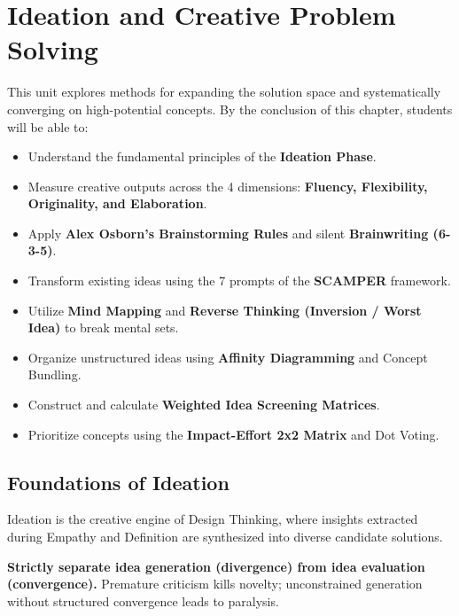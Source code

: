 \chapter{Ideation and Creative Problem Solving}
\label{chap:ideation_creative_solving}

\begin{tcolorbox}[enhanced, colback=boxnavybg, colframe=brandnavy, boxrule=1.2pt, arc=4pt, title={\Large\bfseries\sffamily Unit 3 Overview \& Learning Objectives}]
\sffamily\normalsize
This unit explores methods for expanding the solution space and systematically converging on high-potential concepts. By the conclusion of this chapter, students will be able to:
\begin{itemize}[leftmargin=1.2em, itemsep=2pt, topsep=3pt]
    \item Understand the fundamental principles of the \textbf{Ideation Phase}.
    \item Measure creative outputs across the 4 dimensions: \textbf{Fluency, Flexibility, Originality, and Elaboration}.
    \item Apply \textbf{Alex Osborn's Brainstorming Rules} and silent \textbf{Brainwriting (6-3-5)}.
    \item Transform existing ideas using the 7 prompts of the \textbf{SCAMPER} framework.
    \item Utilize \textbf{Mind Mapping} and \textbf{Reverse Thinking (Inversion / Worst Idea)} to break mental sets.
    \item Organize unstructured ideas using \textbf{Affinity Diagramming} and Concept Bundling.
    \item Construct and calculate \textbf{Weighted Idea Screening Matrices}.
    \item Prioritize concepts using the \textbf{Impact-Effort 2x2 Matrix} and Dot Voting.
\end{itemize}
\end{tcolorbox}

\section{Foundations of Ideation}

Ideation is the creative engine of Design Thinking, where insights extracted during Empathy and Definition are synthesized into diverse candidate solutions. 

\begin{definition}
\textbf{Strictly separate idea generation (divergence) from idea evaluation (convergence).} Premature criticism kills novelty; unconstrained generation without structured convergence leads to paralysis.
\end{definition}

